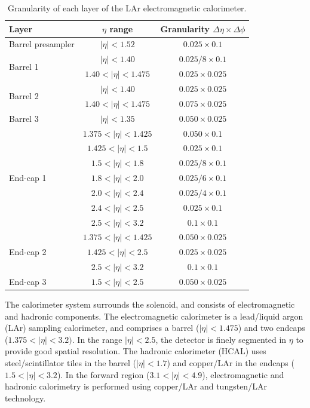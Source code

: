 \begin{table}[htbp]
	\centering
	\begin{tabular}{|l|c|c|}
		\hline
		Layer & $\eta$ range & Granularity $\Delta\eta\times\Delta\phi$ \\
		\hline
		Barrel presampler & $|\eta|<1.52$ & $0.025\times0.1$ \\
		\hline
		\multirow{2}{*}{Barrel 1} & $|\eta|<1.40$ & $0.025 / 8 \times 0.1$ \\
		 & $1.40<|\eta|<1.475$ & $0.025\times0.025$ \\
		\hline
		\multirow{2}{*}{Barrel 2} & $|\eta|<1.40$ & $0.025\times0.025$ \\
		 & $1.40<|\eta|<1.475$ & $0.075\times 0.025$ \\
		\hline
		Barrel 3 & $|\eta|<1.35$ & $0.050\times0.025$ \\
		\hline
		\hline
		\multirow{7}{*}{End-cap 1} & $1.375<|\eta|<1.425$ & $0.050\times0.1$ \\
		 & $1.425<|\eta|<1.5$ & $0.025\times0.1$ \\
		 & $1.5<|\eta|<1.8$ & $0.025/8\times0.1$ \\
		 & $1.8<|\eta|<2.0$ & $0.025/6\times0.1$ \\
		 & $2.0<|\eta|<2.4$ & $0.025/4\times0.1$ \\
		 & $2.4<|\eta|<2.5$ & $0.025\times0.1$ \\
		 & $2.5<|\eta|<3.2$ & $0.1\times0.1$ \\
		\hline
		\multirow{3}{*}{End-cap 2} & $1.375<|\eta|<1.425$ & $0.050\times0.025$ \\
		 & $1.425<|\eta|<2.5$ & $0.025\times0.025$ \\
		 & $2.5<|\eta|<3.2$ & $0.1\times0.1$ \\
		\hline
		End-cap 3 & $1.5<|\eta|<2.5$ & $0.050\times0.025$ \\
		\hline
	\end{tabular}
	\caption{Granularity of each layer of the LAr electromagnetic calorimeter.}
	\label{table:ATLAS-LAr-segmentation}
\end{table}





The calorimeter system surrounds the solenoid, and consists of electromagnetic and hadronic components. The electromagnetic calorimeter is a lead/liquid argon (LAr) sampling calorimeter, and comprises a barrel ($|\eta|<1.475$) and two endcaps ($1.375<|\eta|<3.2)$. In the range $|\eta|<2.5$, the detector is finely segmented in $\eta$ to provide good spatial resolution. The hadronic calorimeter (HCAL) uses steel/scintillator tiles in the barrel ($|\eta|<1.7$) and copper/LAr in the endcaps ($1.5<|\eta|<3.2$). In the forward region ($3.1<|\eta|<4.9$), electromagnetic and hadronic calorimetry is performed using copper/LAr and tungsten/LAr technology.



